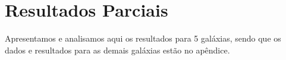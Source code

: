 \chapter{Resultados Parciais}
\label{cap03}
Apresentamos e analisamos aqui os resultados para 5 galáxias, sendo que os dados e resultados para as demais galáxias estão no apêndice.



